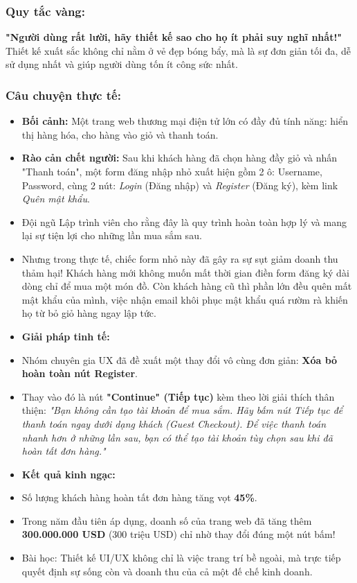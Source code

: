 \documentclass[11pt,a4paper,oneside]{report}
\begin{document}
\subsubsection{Quy tắc vàng:}
\begin{myquote}
\textbf{"Người dùng rất lười, hãy thiết kế sao cho họ ít phải suy nghĩ nhất!"}
Thiết kế xuất sắc không chỉ nằm ở vẻ đẹp bóng bẩy, mà là sự đơn giản tối đa, dễ sử dụng nhất và giúp người dùng tốn ít công sức nhất.
\end{myquote}

\subsubsection{Câu chuyện thực tế:}
\begin{itemize}[leftmargin=1.5em]
\item \textbf{Bối cảnh:} Một trang web thương mại điện tử lớn có đầy đủ tính năng: hiển thị hàng hóa, cho hàng vào giỏ và thanh toán.
\item \textbf{Rào cản chết người:} Sau khi khách hàng đã chọn hàng đầy giỏ và nhấn "Thanh toán", một form đăng nhập nhỏ xuất hiện gồm 2 ô: Username, Password, cùng 2 nút: \textit{Login} (Đăng nhập) và \textit{Register} (Đăng ký), kèm link \textit{Quên mật khẩu}.
\item Đội ngũ Lập trình viên cho rằng đây là quy trình hoàn toàn hợp lý và mang lại sự tiện lợi cho những lần mua sắm sau.
\item Nhưng trong thực tế, chiếc form nhỏ này đã gây ra sự sụt giảm doanh thu thảm hại! Khách hàng mới không muốn mất thời gian điền form đăng ký dài dòng chỉ để mua một món đồ. Còn khách hàng cũ thì phần lớn đều quên mất mật khẩu của mình, việc nhận email khôi phục mật khẩu quá rườm rà khiến họ từ bỏ giỏ hàng ngay lập tức.
\item \textbf{Giải pháp tinh tế:}
\item Nhóm chuyên gia UX đã đề xuất một thay đổi vô cùng đơn giản: \textbf{Xóa bỏ hoàn toàn nút Register}.
\item Thay vào đó là nút \textbf{"Continue" (Tiếp tục)} kèm theo lời giải thích thân thiện: \textit{"Bạn không cần tạo tài khoản để mua sắm. Hãy bấm nút Tiếp tục để thanh toán ngay dưới dạng khách (Guest Checkout). Để việc thanh toán nhanh hơn ở những lần sau, bạn có thể tạo tài khoản tùy chọn sau khi đã hoàn tất đơn hàng."}
\item \textbf{Kết quả kinh ngạc:}
\item Số lượng khách hàng hoàn tất đơn hàng tăng vọt \textbf{45\%}.
\item Trong năm đầu tiên áp dụng, doanh số của trang web đã tăng thêm \textbf{300.000.000 USD} (300 triệu USD) chỉ nhờ thay đổi đúng một nút bấm!
\item Bài học: Thiết kế UI/UX không chỉ là việc trang trí bề ngoài, mà trực tiếp quyết định sự sống còn và doanh thu của cả một đế chế kinh doanh.
\end{itemize}
\end{document}
